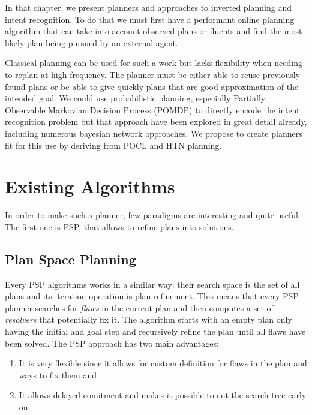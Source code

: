 \documentclass[11pt,a4paper,twoside,openright,titlepage,numbers=noenddot,headinclude,cleardoublepage=empty,openany]{scrreprt}
\theoremstyle{plain}
\theoremstyle{definition}
\theoremstyle{remark}
\providecommand{\tightlist}{%
  \setlength{\itemsep}{0pt}\setlength{\parskip}{0pt}}
\begin{document}
In that chapter, we present planners and approaches to inverted planning
and intent recognition. To do that we must first have a performant
online planning algorithm that can take into account observed plans or
fluents and find the most likely plan being pursued by an external
agent.

Classical planning can be used for such a work but lacks flexibility
when needing to replan at high frequency. The planner must be either
able to reuse previously found plans or be able to give quickly plans
that are good approximation of the intended goal. We could use
probabilistic planning, especially Partially Observable Markovian
Decision Process (POMDP) to directly encode the intent recognition
problem but that approach have been explored in great detail already,
including numerous bayesian network approaches. We propose to create
planners fit for this use by deriving from POCL and HTN planning.

\hypertarget{existing-algorithms}{%
\section{Existing Algorithms}\label{existing-algorithms}}

In order to make such a planner, few paradigms are interesting and quite
useful. The first one is PSP, that allows to refine plans into
solutions.

\hypertarget{plan-space-planning-1}{%
\subsection{Plan Space Planning}\label{plan-space-planning-1}}

Every PSP algorithms works in a similar way: their search space is the
set of all plans and its iteration operation is plan refinement. This
means that every PSP planner searches for \emph{flaws} in the current
plan and then computes a set of \emph{resolvers} that potentially fix
it. The algorithm starts with an empty plan only having the initial and
goal step and recursively refine the plan until all flaws have been
solved. The PSP approach has two main advantages:

\begin{enumerate}
\def\labelenumi{\arabic{enumi}.}
\tightlist
\item
  It is very flexible since it allows for custom definition for flaws in
  the plan and ways to fix them and
\item
  It allows delayed comitment and makes it possible to cut the search
  tree early on.
\end{enumerate}
\end{document}
